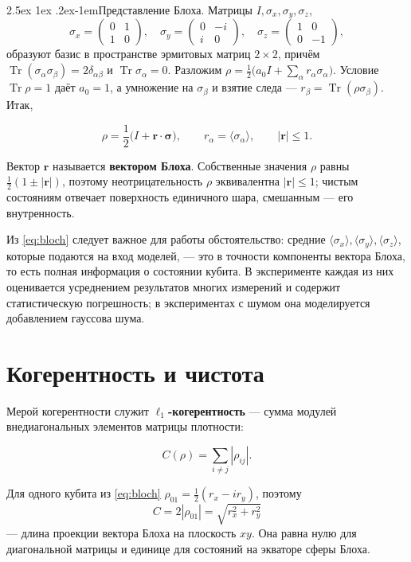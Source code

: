 \documentclass[12pt,a4paper]{report}
\makeatletter
\renewcommand\paragraph{\@startsection{paragraph}{4}{\z@}%
  {2.5ex \@plus1ex \@minus.2ex}{-1em}{\normalfont\normalsize\bfseries}}
\numberwithin{equation}{chapter}
\newcommand{\Tr}{\operatorname{Tr}}
\makeatother
\begin{document}
\paragraph{Представление Блоха.} Матрицы $I,\sigma_x,\sigma_y,\sigma_z$,
\[
\sigma_x=\begin{pmatrix}0&1\\1&0\end{pmatrix},\quad
\sigma_y=\begin{pmatrix}0&-i\\ i&0\end{pmatrix},\quad
\sigma_z=\begin{pmatrix}1&0\\0&-1\end{pmatrix},
\]
образуют базис в пространстве эрмитовых матриц $2\times2$, причём
$\Tr(\sigma_\alpha\sigma_\beta)=2\delta_{\alpha\beta}$ и
$\Tr\sigma_\alpha=0$. Разложим $\rho=\frac12\bigl(a_0I+\sum_\alpha
r_\alpha\sigma_\alpha\bigr)$. Условие $\Tr\rho=1$ даёт $a_0=1$, а умножение на
$\sigma_\beta$ и взятие следа --- $r_\beta=\Tr(\rho\sigma_\beta)$. Итак,
\begin{keybox}
\begin{equation}
\rho=\frac12\bigl(I+\mathbf r\cdot\boldsymbol\sigma\bigr),\qquad
r_\alpha=\langle\sigma_\alpha\rangle,\qquad |\mathbf r|\le1 .
\label{eq:bloch}
\end{equation}
\end{keybox}
Вектор $\mathbf r$ называется \textbf{вектором Блоха}. Собственные значения
$\rho$ равны $\frac12(1\pm|\mathbf r|)$, поэтому неотрицательность $\rho$
эквивалентна $|\mathbf r|\le1$; чистым состояниям отвечает поверхность
единичного шара, смешанным --- его внутренность.

Из \eqref{eq:bloch} следует важное для работы обстоятельство: средние
$\langle\sigma_x\rangle,\langle\sigma_y\rangle,\langle\sigma_z\rangle$,
которые подаются на вход моделей, --- это в точности компоненты вектора Блоха,
то есть полная информация о состоянии кубита. В эксперименте каждая из них
оценивается усреднением результатов многих измерений и содержит
статистическую погрешность; в экспериментах с шумом она моделируется
добавлением гауссова шума.

\section{Когерентность и чистота}

Мерой когерентности служит \textbf{$\ell_1$-когерентность} --- сумма модулей
внедиагональных элементов матрицы плотности:
\begin{keybox}
\begin{equation}
C(\rho)=\sum_{i\neq j}|\rho_{ij}| .
\label{eq:l1}
\end{equation}
\end{keybox}
Для одного кубита из \eqref{eq:bloch} $\rho_{01}=\frac12(r_x-ir_y)$, поэтому
\begin{equation}
C=2|\rho_{01}|=\sqrt{r_x^2+r_y^2}
\end{equation}
--- длина проекции вектора Блоха на плоскость $xy$. Она равна нулю для
диагональной матрицы и единице для состояний на экваторе сферы Блоха.
\end{document}
